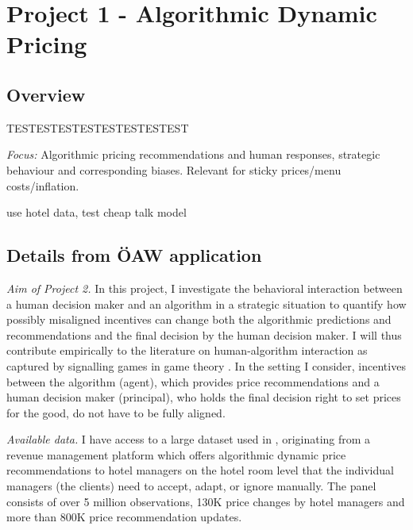 \documentclass[12pt,a4paper]{article}
\begin{document}
\section{Project 1 - Algorithmic Dynamic Pricing}
\label{sec:1}

\subsection{Overview}
TESTESTESTESTESTESTESTEST

	\emph{Focus:} Algorithmic pricing recommendations and human responses, strategic behaviour and corresponding biases. Relevant for sticky prices/menu costs/inflation.

use hotel data, test cheap talk model

\subsection{Details from ÖAW application}

\emph{Aim of Project 2.} In this project, I investigate the behavioral interaction between a human decision maker and an algorithm in a strategic situation to quantify how possibly misaligned incentives can change both the algorithmic predictions and recommendations and the final decision by the human decision maker. I will thus contribute empirically to the literature on human-algorithm interaction as captured by signalling games in game theory \citep{backus2019empirical}. In the setting I consider, incentives between the algorithm (agent), which provides price recommendations and a human decision maker (principal), who holds the final decision right to set prices for the good, do not have to be fully aligned.

\emph{Available data.} I have access to a large dataset used in \citet{GTW2021demandest}, originating from a revenue management platform which offers algorithmic dynamic price recommendations to hotel managers on the hotel room level that the individual managers (the clients) need to accept, adapt, or ignore manually. The panel consists of over 5 million observations, 130K price changes by hotel managers and more than 800K price recommendation updates.
\end{document}
